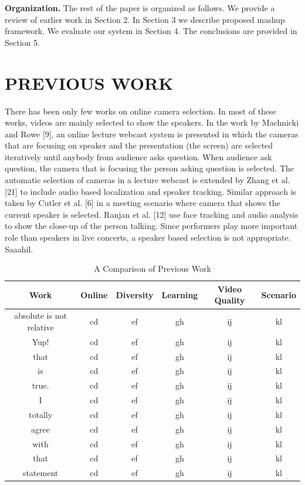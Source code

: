 \documentclass{sig-alternate-05-2015}
\begin{document}
\textbf{Organization.} The rest of the paper is organized as follows.
We provide a review of earlier work in Section 2. In Section 3 we
describe proposed mashup framework. We evaluate our system in
Section 4. The conclusions are provided in Section 5.

\section{PREVIOUS WORK}
There has been only few works on online camera selection. In
most of these works, videos are mainly selected to show the speakers.
In the work by Machnicki and Rowe [9], an online lecture
webcast system is presented in which the cameras that are focusing
on speaker and the presentation (the screen) are selected iteratively
until anybody from audience asks question. When audience ask
question, the camera that is focusing the person asking question is
selected. The automatic selection of cameras in a lecture webcast
is extended by Zhang et al. [21] to include audio based localization
and speaker tracking. Similar approach is taken by Cutler et al. [6]
in a meeting scenario where camera that shows the current speaker
is selected. Ranjan et al. [12] use face tracking and audio analysis
to show the close-up of the person talking. Since performers
play more important role than speakers in live concerts, a speaker
based selection is not appropriate. Saaahil.\par
\begin{table}
\centering
\caption{A Comparison of Previous Work}
\begin{tabular}{|c|c|c|c|c|c} \hline
Work&Online&Diversity&Learning&Video Quality&Scenario\\ \hline
absolute is not relative&cd&ef&gh&ij&kl\\ \hline
Yup!&cd&ef&gh&ij&kl\\ \hline
that&cd&ef&gh&ij&kl\\ \hline
is&cd&ef&gh&ij&kl\\ \hline
true.&cd&ef&gh&ij&kl\\ \hline
I&cd&ef&gh&ij&kl\\ \hline
totally&cd&ef&gh&ij&kl\\ \hline
agree&cd&ef&gh&ij&kl\\ \hline
with&cd&ef&gh&ij&kl\\ \hline
that&cd&ef&gh&ij&kl\\ \hline
statement&cd&ef&gh&ij&kl\\ \hline
\end{tabular}
\end{table}
\end{document}
